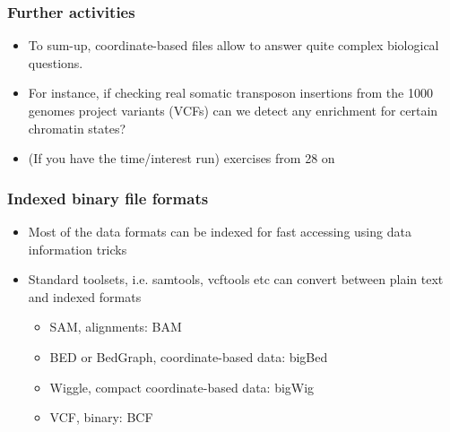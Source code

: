 \documentclass{beamer}
\begin{document}













\begin{frame}
  \frametitle{Further activities}
  \begin{itemize}
  \item To sum-up, coordinate-based files allow to answer quite complex biological questions.
  \item For instance, if checking real somatic transposon insertions from the 1000 genomes project variants (VCFs) can we detect any enrichment for certain chromatin states?
  \item (If you have the time/interest run) exercises from 28 on
  \end{itemize}
\end{frame}


\begin{frame}
  \frametitle{Indexed binary file formats}

  \begin{itemize}
  \item Most of the data formats can be indexed for fast accessing using data information tricks
  \item Standard toolsets, i.e. samtools, vcftools etc can convert between plain text and indexed formats

    \begin{itemize}
    \item SAM, alignments: BAM
    \item BED or BedGraph, coordinate-based data: bigBed
    \item Wiggle, compact coordinate-based data: bigWig
    \item VCF, binary: BCF
    \end{itemize}
  \end{itemize}

\end{frame}
\end{document}
